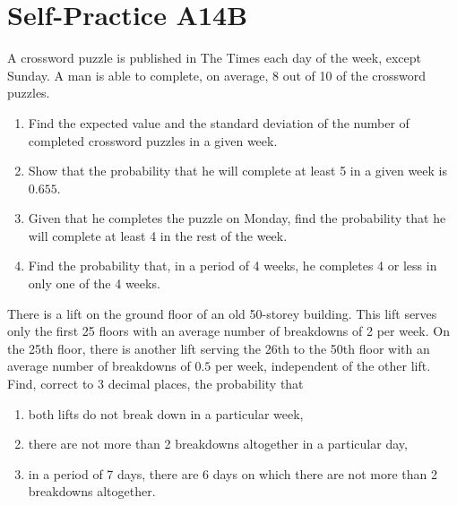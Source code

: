 \section{Self-Practice A14B}

\begin{problem}
    A crossword puzzle is published in The Times each day of the week, except Sunday. A man is able to complete, on average, 8 out of 10 of the crossword puzzles.

    \begin{enumerate}
        \item Find the expected value and the standard deviation of the number of completed crossword puzzles in a given week.
        \item Show that the probability that he will complete at least 5 in a given week is $0.655$.
        \item Given that he completes the puzzle on Monday, find the probability that he will complete at least 4 in the rest of the week.
        \item Find the probability that, in a period of 4 weeks, he completes 4 or less in only one of the 4 weeks.
    \end{enumerate}
\end{problem}

\begin{problem}
    There is a lift on the ground floor of an old 50-storey building. This lift serves only the first 25 floors with an average number of breakdowns of 2 per week. On the 25th floor, there is another lift serving the 26th to the 50th floor with an average number of breakdowns of $0.5$ per week, independent of the other lift. Find, correct to 3 decimal places, the probability that

    \begin{enumerate}
        \item both lifts do not break down in a particular week,
        \item there are not more than 2 breakdowns altogether in a particular day,
        \item in a period of 7 days, there are 6 days on which there are not more than 2 breakdowns altogether.
    \end{enumerate}
\end{problem}

